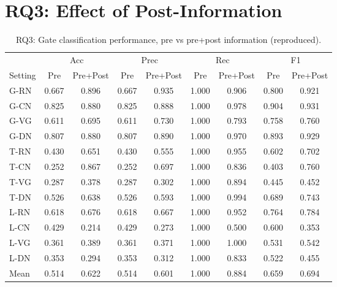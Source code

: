 \documentclass{article}
\begin{document}
\section*{RQ3: Effect of Post-Information}

\begin{table}[h]
\centering
\caption{RQ3: Gate classification performance, pre vs pre+post information (reproduced).}
\label{tab:repro_rq3_gate_clf}
\scriptsize
\begin{tabular}{lcccccccc}
\toprule
& \multicolumn{2}{c}{Acc} & \multicolumn{2}{c}{Prec} & \multicolumn{2}{c}{Rec} & \multicolumn{2}{c}{F1} \\
Setting & Pre & Pre+Post & Pre & Pre+Post & Pre & Pre+Post & Pre & Pre+Post \\
\midrule
G-RN & 0.667 & 0.896 & 0.667 & 0.935 & 1.000 & 0.906 & 0.800 & 0.921 \\
G-CN & 0.825 & 0.880 & 0.825 & 0.888 & 1.000 & 0.978 & 0.904 & 0.931 \\
G-VG & 0.611 & 0.695 & 0.611 & 0.730 & 1.000 & 0.793 & 0.758 & 0.760 \\
G-DN & 0.807 & 0.880 & 0.807 & 0.890 & 1.000 & 0.970 & 0.893 & 0.929 \\
T-RN & 0.430 & 0.651 & 0.430 & 0.555 & 1.000 & 0.955 & 0.602 & 0.702 \\
T-CN & 0.252 & 0.867 & 0.252 & 0.697 & 1.000 & 0.836 & 0.403 & 0.760 \\
T-VG & 0.287 & 0.378 & 0.287 & 0.302 & 1.000 & 0.894 & 0.445 & 0.452 \\
T-DN & 0.526 & 0.638 & 0.526 & 0.593 & 1.000 & 0.994 & 0.689 & 0.743 \\
L-RN & 0.618 & 0.676 & 0.618 & 0.667 & 1.000 & 0.952 & 0.764 & 0.784 \\
L-CN & 0.429 & 0.214 & 0.429 & 0.273 & 1.000 & 0.500 & 0.600 & 0.353 \\
L-VG & 0.361 & 0.389 & 0.361 & 0.371 & 1.000 & 1.000 & 0.531 & 0.542 \\
L-DN & 0.353 & 0.294 & 0.353 & 0.312 & 1.000 & 0.833 & 0.522 & 0.455 \\
\midrule
Mean & 0.514 & 0.622 & 0.514 & 0.601 & 1.000 & 0.884 & 0.659 & 0.694 \\
\bottomrule
\end{tabular}
\end{table}
\end{document}
